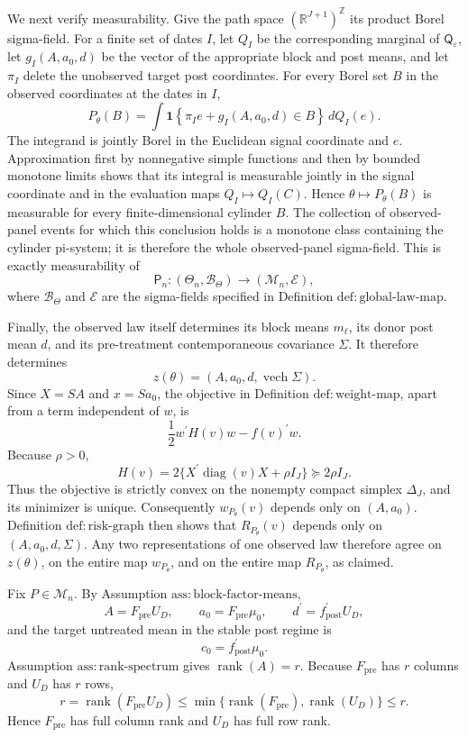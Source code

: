 We next verify measurability.  Give the path space \((\mathbb R^{J+1})^{\mathbb Z}\) its product Borel sigma-field.  For a finite set of dates \(I\), let \(Q_I\) be the corresponding marginal of \(\mathsf Q_\varepsilon\), let \(g_I(A,a_0,d)\) be the vector of the appropriate block and post means, and let \(\pi_I\) delete the unobserved target post coordinates.  For every Borel set \(B\) in the observed coordinates at the dates in \(I\),
\[
P_\theta(B)
=\int
\mathbf 1\!\left\{\pi_I e+g_I(A,a_0,d)\in B\right\}
\,dQ_I(e).
\]
The integrand is jointly Borel in the Euclidean signal coordinate and \(e\).  Approximation first by nonnegative simple functions and then by bounded monotone limits shows that its integral is measurable jointly in the signal coordinate and in the evaluation maps \(Q_I\mapsto Q_I(C)\).  Hence \(\theta\mapsto P_\theta(B)\) is measurable for every finite-dimensional cylinder \(B\).  The collection of observed-panel events for which this conclusion holds is a monotone class containing the cylinder pi-system; it is therefore the whole observed-panel sigma-field.  This is exactly measurability of
\[
\mathsf P_n:(\Theta_n,\mathcal B_\Theta)\longrightarrow
(\mathcal M_n,\mathcal E),
\]
where \(\mathcal B_\Theta\) and \(\mathcal E\) are the sigma-fields specified in Definition \(\mathrm{def:global\mbox{-}law\mbox{-}map}\).

Finally, the observed law itself determines its block means \(m_\ell\), its donor post mean \(d\), and its pre-treatment contemporaneous covariance \(\Sigma\).  It therefore determines
\[
z(\theta)=(A,a_0,d,\operatorname{vech}\Sigma).
\]
Since \(X=SA\) and \(x=Sa_0\), the objective in Definition \(\mathrm{def:weight\mbox{-}map}\), apart from a term independent of \(w\), is
\[
\frac12 w^{\prime}H(v)w-f(v)^{\prime}w.
\]
Because \(\rho>0\),
\[
H(v)=2\{X^{\prime}\operatorname{diag}(v)X+\rho I_J\}
\succeq 2\rho I_J.
\]
Thus the objective is strictly convex on the nonempty compact simplex \(\Delta_J\), and its minimizer is unique.  Consequently \(w_{P_\theta}(v)\) depends only on \((A,a_0)\).  Definition \(\mathrm{def:risk\mbox{-}graph}\) then shows that \(R_{P_\theta}(v)\) depends only on \((A,a_0,d,\Sigma)\).  Any two representations of one observed law therefore agree on \(z(\theta)\), on the entire map \(w_{P_\theta}\), and on the entire map \(R_{P_\theta}\), as claimed.

Fix \(P\in\mathcal M_n\).  By Assumption \(\mathrm{ass:block\mbox{-}factor\mbox{-}means}\),
\[
A=F_{\mathrm{pre}}U_D,\qquad
a_0=F_{\mathrm{pre}}\mu_0,\qquad
d^{\prime}=f_{\mathrm{post}}^{\prime}U_D,
\]
and the target untreated mean in the stable post regime is
\[
c_0=f_{\mathrm{post}}^{\prime}\mu_0.
\]
Assumption \(\mathrm{ass:rank\mbox{-}spectrum}\) gives \(\operatorname{rank}(A)=r\).  Because \(F_{\mathrm{pre}}\) has \(r\) columns and \(U_D\) has \(r\) rows,
\[
r=\operatorname{rank}(F_{\mathrm{pre}}U_D)
\leq\min\{\operatorname{rank}(F_{\mathrm{pre}}),
\operatorname{rank}(U_D)\}
\leq r.
\]
Hence \(F_{\mathrm{pre}}\) has full column rank and \(U_D\) has full row rank.

